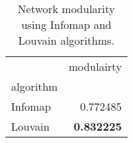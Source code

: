 \begin{table}[!htbp]
\centering
\caption{Network modularity using Infomap and Louvain algorithms.}
\label{tab:modularity}
\begin{tabular}{lr}
\toprule
 & modulairty \\
algorithm &  \\
\midrule
Infomap & 0.772485 \\
Louvain & \textbf{0.832225} \\
\bottomrule
\end{tabular}
\end{table}

